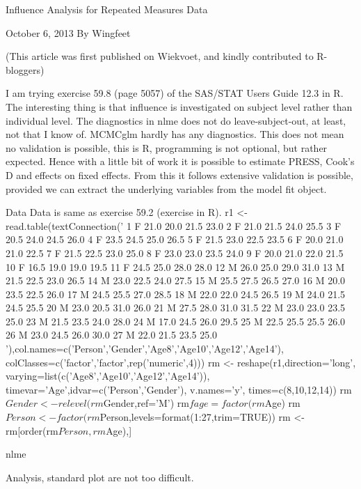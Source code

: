 Influence Analysis for Repeated Measures Data


October 6, 2013
By Wingfeet










 (This article was first published on Wiekvoet, and kindly contributed to R-bloggers)

 I am trying exercise 59.8 (page 5057) of the SAS/STAT Users Guide 12.3 in R. The interesting thing is that influence is investigated on subject level rather than individual level. The diagnostics in nlme does not do leave-subject-out, at least, not that I know of. MCMCglm hardly has any diagnostics. This does not mean no validation is possible, this is R, programming is not optional, but rather expected. Hence with a little bit of work it is possible to estimate PRESS, Cook's D and effects on fixed effects. From this it follows extensive validation is possible, provided we can extract the underlying variables from the model fit object.

Data
Data is same as exercise 59.2 (exercise in R).
r1 <- read.table(textConnection('
1 F 21.0 20.0 21.5 23.0
2 F 21.0 21.5 24.0 25.5
3 F 20.5 24.0 24.5 26.0
4 F 23.5 24.5 25.0 26.5
5 F 21.5 23.0 22.5 23.5
6 F 20.0 21.0 21.0 22.5
7 F 21.5 22.5 23.0 25.0
8 F 23.0 23.0 23.5 24.0
9 F 20.0 21.0 22.0 21.5
10 F 16.5 19.0 19.0 19.5
11 F 24.5 25.0 28.0 28.0
12 M 26.0 25.0 29.0 31.0
13 M 21.5 22.5 23.0 26.5
14 M 23.0 22.5 24.0 27.5
15 M 25.5 27.5 26.5 27.0
16 M 20.0 23.5 22.5 26.0
17 M 24.5 25.5 27.0 28.5
18 M 22.0 22.0 24.5 26.5
19 M 24.0 21.5 24.5 25.5
20 M 23.0 20.5 31.0 26.0
21 M 27.5 28.0 31.0 31.5
22 M 23.0 23.0 23.5 25.0
23 M 21.5 23.5 24.0 28.0
24 M 17.0 24.5 26.0 29.5
25 M 22.5 25.5 25.5 26.0
26 M 23.0 24.5 26.0 30.0
27 M 22.0 21.5 23.5 25.0
'),col.names=c('Person','Gender','Age8','Age10','Age12','Age14'),
colClasses=c('factor','factor',rep('numeric',4)))
rm <- reshape(r1,direction='long',
    varying=list(c('Age8','Age10','Age12','Age14')),
    timevar='Age',idvar=c('Person','Gender'),
    v.names='y',
    times=c(8,10,12,14))
rm$Gender <- relevel(rm$Gender,ref='M')
rm$fage=factor(rm$Age)
rm$Person <- factor(rm$Person,levels=format(1:27,trim=TRUE))
rm <- rm[order(rm$Person,rm$Age),]

nlme

Analysis, standard plot are not too difficult.


